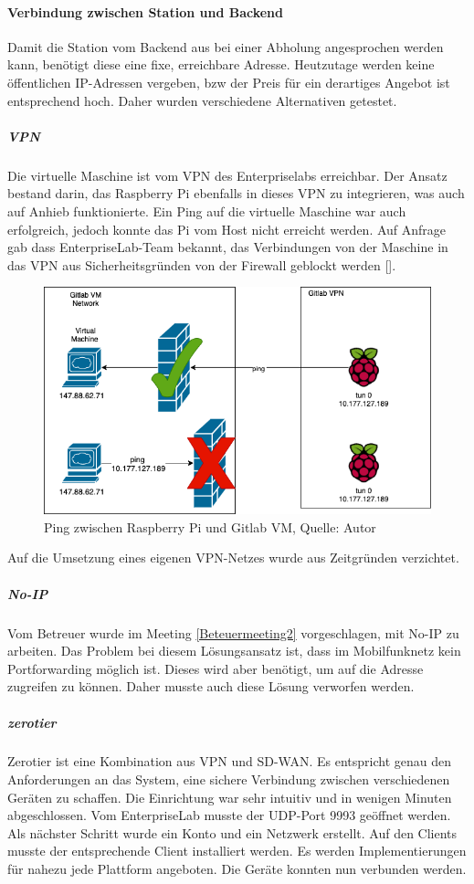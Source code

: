 \paragraph{Verbindung zwischen Station und Backend}
Damit die Station vom Backend aus bei einer Abholung angesprochen werden kann, benötigt diese eine fixe, erreichbare Adresse. Heutzutage werden keine öffentlichen IP-Adressen vergeben, \ac{bzw} der Preis für ein derartiges Angebot ist entsprechend hoch. Daher wurden verschiedene Alternativen getestet. 
\subparagraph{VPN}
Die virtuelle Maschine ist vom VPN des Enterpriselabs erreichbar. Der Ansatz bestand darin, das Raspberry Pi ebenfalls in dieses VPN zu integrieren, was auch auf Anhieb funktionierte. Ein Ping auf die virtuelle Maschine war auch erfolgreich, jedoch konnte das Pi vom Host nicht erreicht werden. Auf Anfrage gab dass \gls{EnterpriseLab}-Team bekannt, das Verbindungen von der Maschine in das \ac{VPN} aus Sicherheitsgründen von der Firewall geblockt werden [\cite{chatVonUslar:private}]. 
\begin{figure}[H]
	\centering
	\includegraphics[scale=0.5]{images/enterpriselabVPN.PNG}
	\caption[Ping zwischen Raspberry Pi und Gitlab VM]{Ping zwischen Raspberry Pi und Gitlab VM, Quelle: Autor}
	\label{img: enterpriselabVPN}
\end{figure} 
Auf die Umsetzung eines eigenen VPN-Netzes wurde aus Zeitgründen verzichtet. 
\subparagraph{No-IP}
Vom Betreuer wurde im Meeting \ref{Beteuermeeting2} vorgeschlagen, mit No-IP zu arbeiten. Das Problem bei diesem Lösungsansatz ist, dass im Mobilfunknetz kein Portforwarding möglich ist. Dieses wird aber benötigt, um auf die Adresse zugreifen zu können. Daher musste auch diese Lösung verworfen werden. 
\subparagraph{zerotier}
Zerotier ist eine Kombination aus \ac{VPN} und \ac{SD-WAN}. Es entspricht genau den Anforderungen an das System, eine sichere Verbindung zwischen verschiedenen Geräten zu schaffen. Die Einrichtung war sehr intuitiv und in wenigen Minuten abgeschlossen. Vom \gls{EnterpriseLab} musste der \ac{UDP}-Port 9993 geöffnet werden. Als nächster Schritt wurde ein Konto und ein Netzwerk erstellt. Auf den Clients musste der entsprechende Client installiert werden. Es werden Implementierungen für nahezu jede Plattform angeboten. Die Geräte konnten nun verbunden werden. 
